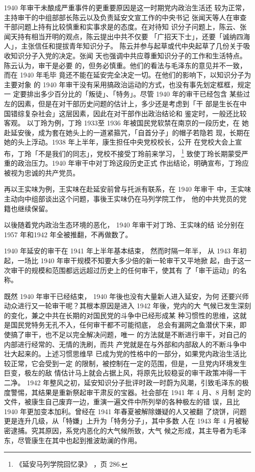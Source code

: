 1940 年审干未酿成严重事件的更重要原因是这一时期党内政治生活还
较为正常，主持审干的中组部部长陈云以及负责延安文宣工作的中央书记
张闻天等人在审查干部问题上持有比较慎重和实事求是的态度。在对待知
识分子问题上，陈云、张闻天持有相当开明的观点，陈云提出中共不仅要
「广招天下士」，还要「诚纳四海人」，主张信任和提拔青年知识分子。
陈云并参与起草或代中央起草了几份关于吸收知识分子入党的决定。张闻
天也强调中共应尊重知识分子的工作和生活特点。陈云认为，审干是必要
的，但务必慎重。他们的看法与毛泽东的意见并不一致，而在 1940 年毛毕
竟还不能在延安完全决定一切。在他们的影响下，以知识分子为主要对象
的 1940 年审干没有采用搞政治运动的方式，也没有事先划定框框，规定一
定要排出多少百分比的「叛徒」、「特务」。尽管 1940 年的审干已经包含
某些过左的因素，但是在对干部历史问题的估计上，多少还是考虑到「干
部是生长在中国错综复杂社会」这层因素，因此在对干部作出政治结论和
鉴定时，一般还比较客观。
以丁玲为例，丁玲 1933至 1936 年被国民党软禁在南京的一段历史，在
她赴延安後，成为套在她头上的一道紧箍咒，「自首分子」的帽子若隐若
现，长期在她的头上浮动。1938 年上半年，康生担任中央党校校长，公开
在党校大会上宣布，丁玲「不是我们的同志」，党校不接受丁玲前来学习，
\footnote{《延安马列学院回忆录》
，页 286.}
致使丁玲长期蒙受严重的政治压力。1940 年审干中对丁玲这段历史正式
作出结论，明确宣布，丁玲应被视为忠诚的共产党员。

再以王实味为例，王实味在赴延安前曾与托派有联系，在 1940 年审干
中，王实味主动向中组部谈出这个问题，事後王实味仍在马列学院工作，
他的中共党员的党籍也继续保留。

以後随着党内政治生态环境的恶化， 1940 年审干对丁玲、王实味的结
论分别在 1957 年和1942 年全被推翻，不再做数了。

1940 年延安的审干在 1941 年上半年基本结束，
然而时隔一年半，
从 1943
年初起，一场比 1940 年审干规模不知要大多少倍的新一轮审干又平地掀
起，由于这一次审干的规模和范围都远远超过历史上的任何审干，使其有
了「审干运动」的名称。

既然 1940 年审干已经结束， 1940 年後也没有大量新人进入延安，为何
还要兴师动众进行又一轮审干呢？其根本原因是进入 1942 年後，党内的大
气候已发生深刻的变化，兼之中共在长期的对国民党的斗争中已经形成某
种习惯性的思维，这就是国民党特务无孔不入，任何审干都不可能彻底，
总会有漏网之鱼潜伏下来，即使搞了审干，也不足以完全解决问题，唯一
的方法就是不断进行审干，对自己的内部进行经常的、无情的洗刷，而共
产党就是在与外部和内部敌人的不断斗争中壮大起来的。上述习惯思维早
已成为党的性格中的一部分，如果党内政治生活比较正常，它会受到一定
的限制，被控制在一定的范围，但是，一旦党内环境发生巨变，极左的敌
情估计马上就会占据上风，将原先比较稳妥的审干政策冲得一干二净。
1942 年整风之初，延安知识分子批评时政一时蔚为风潮，引致毛泽东的极
度警惕，其结果是重新祭起审干肃反的宝器。社会部在 1941 年 4 月、8 月制
定的文件，被康生自己废弃一边，重演一遍文件中所列举的各种极左的错
误，且比 1940 年更加变本加利。曾经在 1941 年春夏被解除嫌疑的人又被翻
了烧饼，问题更是连升几级，从「特嫌」上升为「特务分子」，其中多数
人在 1943 年 4 月被秘密逮捕。究其原因，系党内恶化的大气候所致，大气
候之形成，其主导者为毛泽东，尽管康生在其中也起到推波助澜的作用。

